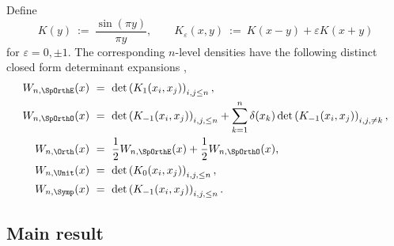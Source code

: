 \documentclass[12pt, reqno]{amsart}
\numberwithin{equation}{section}
\theoremstyle{definition}
\theoremstyle{remark}
\renewcommand{\epsilon}{\varepsilon}
\begin{document}
Define
	\[ K(y) \ := \  \frac{\sin (\pi y)}{\pi y}, \qquad K_\epsilon (x, y) \ := \  K(x - y) + \epsilon K(x + y) \]
for $\epsilon = 0, \pm 1$. The corresponding $n$-level densities have the following distinct closed form determinant expansions \cite{HughesMiller, KatzSarnak},
	\begin{align}
		W_{n, \SpOrthE} (x) 	
			&\ = \  \det \left( K_1 (x_i, x_j) \right)_{i, j \leq n}, \label{eq:nlevelSOeven} \\
		W_{n, \SpOrthO} (x)
			&\ = \  \det \left( K_{-1} (x_i, x_j) \right)_{i, j, \leq n} + \sum_{k  =  1}^n \delta (x_k) \det \left( K_{-1} (x_i, x_j) \right)_{i, j, \neq k},  \\
		W_{n, \Orth} (x)
			&\ = \  \frac12 W_{n, \SpOrthE} (x) + \frac12 W_{n, \SpOrthO} (x), \\
		W_{n, \Unit} (x)
			&\ = \  \det \left( K_0 (x_i, x_j) \right)_{i, j, \leq n}, \\
		W_{n, \Symp} (x)			
			&\ = \ \det \left( K_{-1} (x_i, x_j) \right)_{i, j, \leq n} \label{eq:nlevelSymp}.
	\end{align}



\subsection{Main result}
\end{document}
